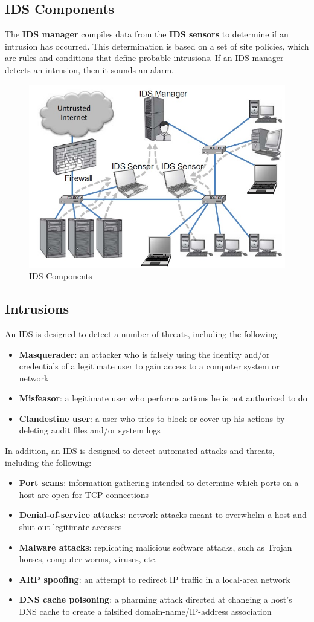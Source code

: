 \subsection{IDS Components}
The \textbf{IDS manager} compiles data from the \textbf{IDS sensors} to determine if an intrusion has occurred. This determination is based on a set of site policies, which are rules and conditions that define probable intrusions. If an IDS manager detects an intrusion, then it sounds an alarm.
\begin{figure}[htbp]
	\centering
	\includegraphics[width=0.5\linewidth]{Immagini/firewalls/IDS.png}
	\caption{IDS Components} 	
	\label{fig:IDS_components}
\end{figure}
\subsection{Intrusions}
An IDS is designed to detect a number of threats, including the following:
\begin{itemize}
\item \textbf{Masquerader}: an attacker who is falsely using the identity and/or credentials of a legitimate user to gain access to a computer system or network
\item \textbf{Misfeasor}: a legitimate user who performs actions he is not authorized to do 
\item \textbf{Clandestine user}: a user who tries to block or cover up his actions by deleting audit files and/or system logs
\end{itemize}
In addition, an IDS is designed to detect automated attacks and threats, including the following:
\begin{itemize}
\item \textbf{Port scans}: information gathering intended to determine which ports on a host are open for TCP connections
\item \textbf{Denial-of-service attacks}: network attacks meant to overwhelm a host and shut out legitimate accesses
\item \textbf{Malware attacks}: replicating malicious software attacks, such as Trojan horses, computer worms, viruses, etc.
\item \textbf{ARP spoofing}: an attempt to redirect IP traffic in a local-area network
\item \textbf{DNS cache poisoning}: a pharming attack directed at changing a host’s DNS cache to create a falsified domain-name/IP-address association
\end{itemize}

